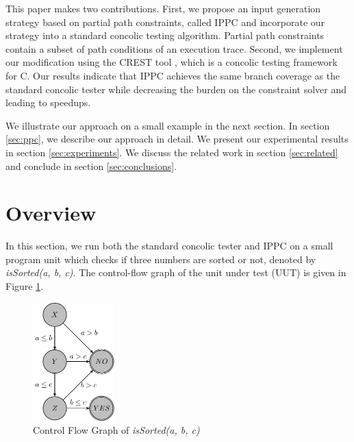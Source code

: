 \documentclass[EPiCempty]{easychair}
\begin{document}
This paper makes two contributions. First, we propose an input generation strategy based on partial path constraints, called IPPC and incorporate our strategy into a standard concolic testing algorithm. Partial path constraints contain a subset of path conditions of an execution trace. Second, we implement our modification using the CREST tool \cite{Burnim:2008:HSD:1642931.1642995}, which is a concolic testing framework for C. Our results indicate that IPPC achieves the same branch coverage as the standard concolic tester while decreasing the burden on the constraint solver and leading to speedups.

We illustrate our approach on a small example in the next section. In section \ref{sec:ppc}, we describe our approach in detail. We present our experimental results in section \ref{sec:experiments}. We discuss the related work in section \ref{sec:related} and conclude in section \ref{sec:conclusions}.

\section{Overview}
\label{sec:overview}

In this section, we run both the standard concolic tester and IPPC on a small program unit which checks if three numbers are sorted or not, denoted by \emph{isSorted(a, b, c)}. The control-flow graph of the unit under test (UUT) is given in Figure \ref{fig_cgf_example}.

\begin{figure}
\centering
\includegraphics[width=0.28\textwidth,natwidth=\linewidth]{tikzfigs-figure0.pdf}
\caption{Control Flow Graph of \emph{isSorted(a, b, c)} \label{fig_cgf_example}}
\end{figure}
\end{document}
